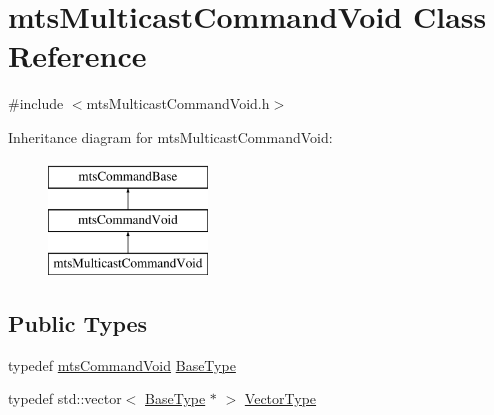 \hypertarget{classmts_multicast_command_void}{\section{mts\-Multicast\-Command\-Void Class Reference}
\label{classmts_multicast_command_void}
}


{\ttfamily \#include $<$mts\-Multicast\-Command\-Void.\-h$>$}

Inheritance diagram for mts\-Multicast\-Command\-Void\-:\begin{figure}[H]
\begin{center}
\leavevmode
\includegraphics[height=3.000000cm]{db/d1f/classmts_multicast_command_void}
\end{center}
\end{figure}
\subsection*{Public Types}
\begin{DoxyCompactItemize}
\item 
typedef \hyperlink{classmts_command_void}{mts\-Command\-Void} \hyperlink{classmts_multicast_command_void_a62fa2f55d19429b000f3cafc044b67a5}{Base\-Type}
\item 
typedef std\-::vector$<$ \hyperlink{classmts_command_void_aa0e2be86c520aef7b9c3a59e3cfbbce3}{Base\-Type} $\ast$ $>$ \hyperlink{classmts_multicast_command_void_a2d0478105f8fcc377056363ab5aa7fa0}{Vector\-Type}
\end{DoxyCompactItemize}
